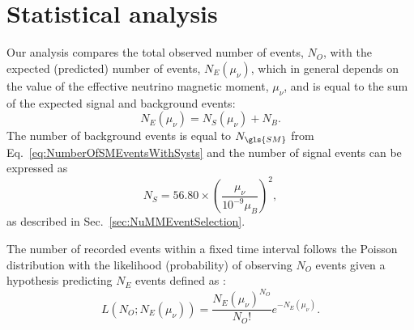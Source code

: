 \section{Statistical analysis}\label{sec:NuMMStatisticalAnalysis}

Our analysis compares the total observed number of events, $N_O$, with the expected (predicted) number of events, $N_E\left(\mu_\nu\right)$, which in general depends on the value of the effective neutrino magnetic moment, $\mu_\nu$, and is equal to the sum of the expected signal and background events:
\begin{equation}
N_E\left(\mu_\nu\right)=N_S\left(\mu_\nu\right)+N_B.
\end{equation}
The number of background events is equal to $N_{\gls{SM}}$ from Eq.~\ref{eq:NumberOfSMEventsWithSysts} and the number of signal events can be expressed as
\begin{equation}\label{eq:NuMMExpectedNumberOfSignalEvents}
N_S=56.80\times\left(\frac{\mu_\nu}{10^{-9}\mu_B}\right)^2,
\end{equation}
as described in Sec.~\ref{sec:NuMMEventSelection}.

The number of recorded events within a fixed time interval follows the Poisson distribution with the likelihood (probability) of observing $N_O$ events given a hypothesis predicting $N_E$ events defined as \cite{PDG.pdf}:
\begin{equation}\label{eq:Likelihood}
L\left(N_O;N_E\left(\mu_\nu\right)\right)=\frac{N_E\left(\mu_\nu\right)^{N_O}}{N_O!}e^{-N_E\left(\mu_\nu\right)}.
\end{equation}

